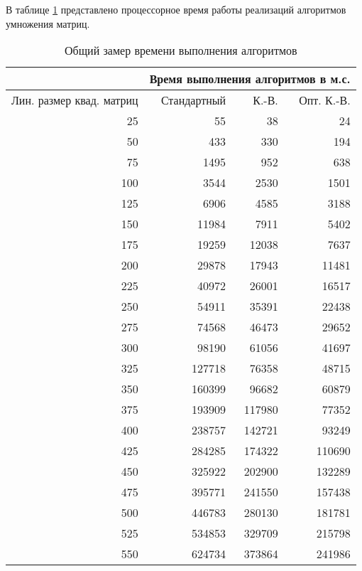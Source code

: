 В таблице \ref{tbl:entire_time} представлено процессорное время работы реализаций алгоритмов умножения матриц.

\begin{table}[h]
	\begin{center}
		\begin{threeparttable}
		\captionsetup{justification=raggedright, singlelinecheck=off}
		\caption{\centering\label{tbl:entire_time}Общий замер времени выполнения алгоритмов}
		\begin{tabular}{|r|r|r|r|}
			\hline
			& \multicolumn{3}{c|}{Время выполнения алгоритмов в м.с.} \\
			\hline
			Лин. размер квад. матриц & Стандартный & К.-В. & Опт. К.-В. \\
			\hline
			25 & 55 & 38 & 24 \\
			\hline
			50 & 433 & 330 & 194 \\
			\hline
			75 & 1495 & 952 & 638 \\
			\hline
			100 & 3544 & 2530 & 1501 \\
			\hline
			125 & 6906 & 4585 & 3188 \\
			\hline
			150 & 11984 & 7911 & 5402 \\
			\hline
			175 & 19259 & 12038 & 7637 \\
			\hline
			200 & 29878 & 17943 & 11481 \\
			\hline
			225 & 40972 & 26001 & 16517 \\
			\hline
			250 & 54911 & 35391 & 22438 \\
			\hline
			275 & 74568 & 46473 & 29652 \\
			\hline
			300 & 98190 & 61056 & 41697 \\
			\hline
			325 & 127718 & 76358 & 48715 \\
			\hline
			350 & 160399 & 96682 & 60879 \\
			\hline
			375 & 193909 & 117980 & 77352 \\
			\hline
			400 & 238757 & 142721 & 93249 \\
			\hline
			425 & 284285 & 174322 & 110690 \\
			\hline
			450 & 325922 & 202900 & 132289 \\
			\hline
			475 & 395771 & 241550 & 157438 \\
			\hline
			500 & 446783 & 280130 & 181781 \\
			\hline
			525 & 534853 & 329709 & 215798 \\
			\hline
			550 & 624734 & 373864 & 241986 \\

\end{tabular}
\end{threeparttable}
\end{center}
\end{table}
